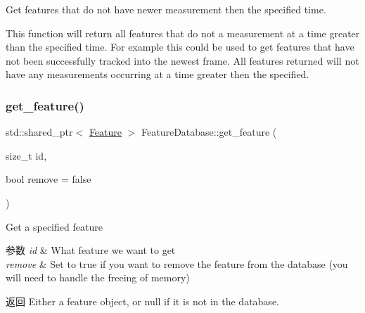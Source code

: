 Get features that do not have newer measurement then the specified time. 

This function will return all features that do not a measurement at a time greater than the specified time. For example this could be used to get features that have not been successfully tracked into the newest frame. All features returned will not have any measurements occurring at a time greater then the specified. \mbox{\label{classov__core_1_1FeatureDatabase_a3c7b5ef425c785eb3c160e995c545f87}} 
\subsubsection{\texorpdfstring{get\+\_\+feature()}{get\_feature()}}
{\footnotesize\ttfamily std\+::shared\+\_\+ptr$<$ \hyperlink{classov__core_1_1Feature}{Feature} $>$ Feature\+Database\+::get\+\_\+feature (\begin{DoxyParamCaption}\item[{size\+\_\+t}]{id,  }\item[{bool}]{remove = {\ttfamily false} }\end{DoxyParamCaption})}



Get a specified feature 


\begin{DoxyParams}{参数}
{\em id} & What feature we want to get \\
\hline
{\em remove} & Set to true if you want to remove the feature from the database (you will need to handle the freeing of memory) \\
\hline
\end{DoxyParams}
\begin{DoxyReturn}{返回}
Either a feature object, or null if it is not in the database. 
\end{DoxyReturn}
\mbox{\label{classov__core_1_1FeatureDatabase_a98e2d5320881107343b07f79cac8b541}} 
